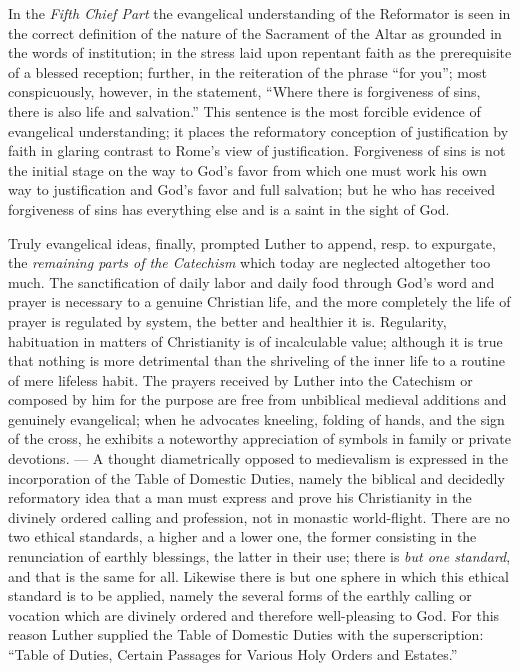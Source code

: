 In the \emph{Fifth Chief Part} the evangelical understanding of the Reformator is seen in the correct definition of the nature of the Sacrament of the Altar as grounded in the words of institution; in the stress laid upon repentant faith as the prerequisite of a blessed reception; further, in the reiteration of the phrase “for you”; most conspicuously, however, in the statement, “Where there is forgiveness of sins, there is also life and salvation.” This sentence is the most
forcible evidence of evangelical understanding; it places the reformatory conception of justification by faith in glaring contrast to Rome’s view of justification. Forgiveness of sins is not the initial stage on the way to God’s favor from which one must work his own way to justification and God’s favor and full salvation; but he who has received forgiveness of sins has everything else and is a saint in the sight of God.

Truly evangelical ideas, finally, prompted Luther to append, resp. to expurgate, the \emph{remaining parts of the Catechism} which today are neglected altogether too much. The sanctification of daily labor and daily food through God’s word and prayer is necessary to a genuine Christian life, and the more completely the life of prayer is regulated by system, the better and healthier it is. Regularity, habituation in matters of Christianity is of incalculable value; although it is true that nothing is more detrimental than the shriveling of the inner life to a routine of mere lifeless habit. The prayers received by Luther into the Catechism or composed by him for the purpose are free from unbiblical medieval additions and genuinely evangelical; when he advocates kneeling, folding of hands, and the sign of the cross, he exhibits a noteworthy appreciation of symbols in family or private devotions. — A thought diametrically opposed to medievalism is expressed in the incorporation of the Table of Domestic Duties, namely the biblical and decidedly reformatory idea that a man must express and prove his Christianity in the divinely ordered calling and profession, not in monastic world-flight. There are no two ethical standards, a higher and a lower one, the former consisting in the renunciation of earthly blessings, the latter in their use; there is \emph{but one standard}, and that is the same for all. Likewise there is but one sphere in which this ethical standard is to be applied, namely the several forms of the earthly calling or vocation which are divinely ordered and therefore well-pleasing to
God. For this reason Luther supplied the Table of Domestic Duties with the superscription: “Table of Duties, Certain Passages for Various Holy Orders and Estates.”

